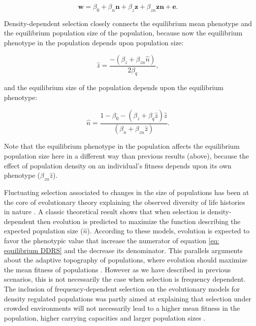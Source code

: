 \documentclass{article}
\begin{document}
\begin{equation} \label{eq: DDRS}
\bm{w}=\beta_{0} +\beta_{n} \bm{n} + \beta_{z} \bm{z}+  \beta_{zn} \bm{zn}  +  \bm{e}.
\end{equation}

\noindent Density-dependent selection closely connects the equilibrium mean phenotype and the equilibrium population size of the population, because now the equilibrium phenotype in the population depends upon population size:

\begin{equation} 
\hat{z}=\frac{-(\beta_{z}+\beta_{zn}\hat{n})}{2\beta_{q}},
\end{equation} 

and the equilibrium size of the population depends upon the equilibrium phenotype:

\begin{equation} \label{eq: equilibrium DDRS}
		\hat{n} = \frac{1-\beta_{0}-(\beta_{z}  + \beta_{q}\hat{z})\hat{z}}{(\beta_{n} +  \beta_{zn} \hat{z})}.
\end{equation}

\noindent Note that the equilibrium phenotype in the population affects the equilibrium population size here in a different way than previous results (above), because the effect of population density on an individual's fitness depends upon its own phenotype ($\beta_{zn} \hat{z}$). 

Fluctuating selection associated to changes in the size of populations has been at the core of evolutionary theory explaining the observed diversity of life histories in nature \citep{Pianka1970,macarthur1967theory, Boyce1984, Mueller1991, Engen2013}. A classic theoretical result \citep{MacArthur1962, Engen2013} shows that when selection is density-dependent then evolution is predicted to maximize the function describing the expected population size ($\hat{n}$). According to these models, evolution is expected to favor the phenotypic value that increase the numerator of equation \ref{eq: equilibrium DDRS} and the decrease its denominator. This parallels arguments about the adaptive topography of populations, where evolution should maximize the mean fitness of populations \citep{Wright1931}. However as we have described in previous scenarios, this is not necessarily the case when selection is frequency dependent. The inclusion of frequency-dependent selection on the evolutionary models for density regulated populations was partly aimed at explaining that selection under crowded environments will not necessarily lead to a higher mean fitness in the population,  higher carrying capacities and larger population sizes \citep{Clarke1972, Anderson1983, Engen2020}. 
\end{document}
